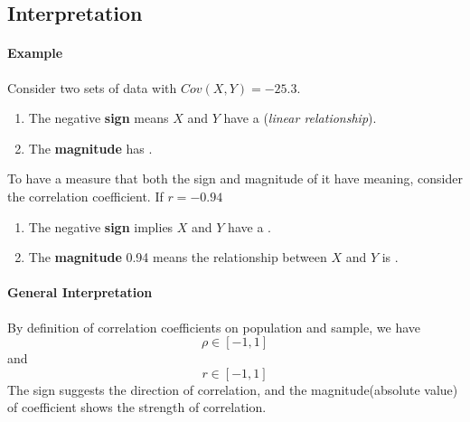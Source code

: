 \documentclass[11pt]{article}
\begin{document}
\subsection{Interpretation}
\paragraph{Example} Consider two sets of data with $Cov(X,Y) = -25.3$.
\begin{enumerate}
	\item The negative \textbf{sign} means $X$ and $Y$ have a  (\emph{linear relationship}).
	\item The \textbf{magnitude} has .
\end{enumerate}

To have a measure that both the sign and magnitude of it have meaning, consider the correlation coefficient. If $r = -0.94$

\begin{enumerate}
	\item The negative \textbf{sign} implies $X$ and $Y$ have a .
	\item The \textbf{magnitude} 0.94 means the relationship between $X$ and $Y$ is .
\end{enumerate}

\paragraph{General Interpretation} By definition of correlation coefficients on population and sample, we have 
\[
	\rho \in [-1,1]
\]
and 
\[
	r \in [-1,1]
\]
The sign suggests the direction of correlation, and the magnitude(absolute value) of coefficient shows the strength of correlation.
\end{document}
